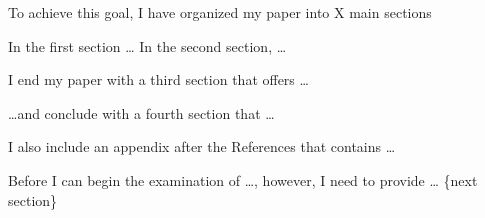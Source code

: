 To achieve this goal, I have organized my paper into X main sections

In the first section \ldots{} In the second section, \ldots{}

I end my paper with a third section that offers \ldots{}

\ldots{}and conclude with a fourth section that \ldots{}

I also include an appendix after the References that contains \ldots{}

Before I can begin the examination of \ldots{}, however, I need to
provide \ldots{} \{next section\}

\endgroup

